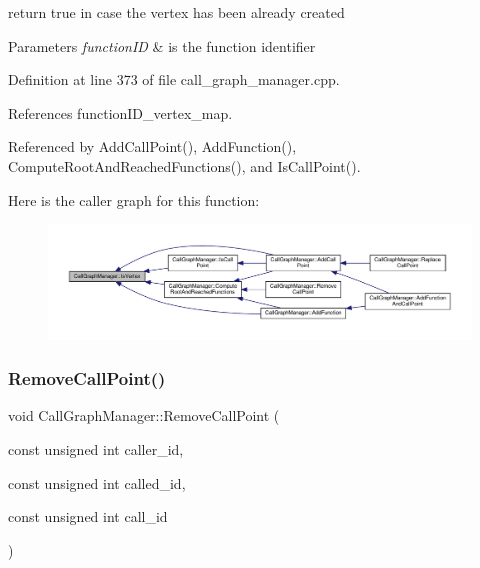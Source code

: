 return true in case the vertex has been already created 


\begin{DoxyParams}{Parameters}
{\em function\+ID} & is the function identifier \\
\hline
\end{DoxyParams}


Definition at line 373 of file call\+\_\+graph\+\_\+manager.\+cpp.



References function\+I\+D\+\_\+vertex\+\_\+map.



Referenced by Add\+Call\+Point(), Add\+Function(), Compute\+Root\+And\+Reached\+Functions(), and Is\+Call\+Point().

Here is the caller graph for this function\+:
\nopagebreak
\begin{figure}[H]
\begin{center}
\leavevmode
\includegraphics[width=350pt]{d5/d96/classCallGraphManager_af8ff924d2289789505467f6641620f9e_icgraph}
\end{center}
\end{figure}
\mbox{\label{classCallGraphManager_a3e4d382c876899b61f2033f68d53159c}} 
\subsubsection{\texorpdfstring{Remove\+Call\+Point()}{RemoveCallPoint()}\hspace{0.1cm}{\footnotesize\ttfamily [1/2]}}
{\footnotesize\ttfamily void Call\+Graph\+Manager\+::\+Remove\+Call\+Point (\begin{DoxyParamCaption}\item[{const unsigned int}]{caller\+\_\+id,  }\item[{const unsigned int}]{called\+\_\+id,  }\item[{const unsigned int}]{call\+\_\+id }\end{DoxyParamCaption})}



